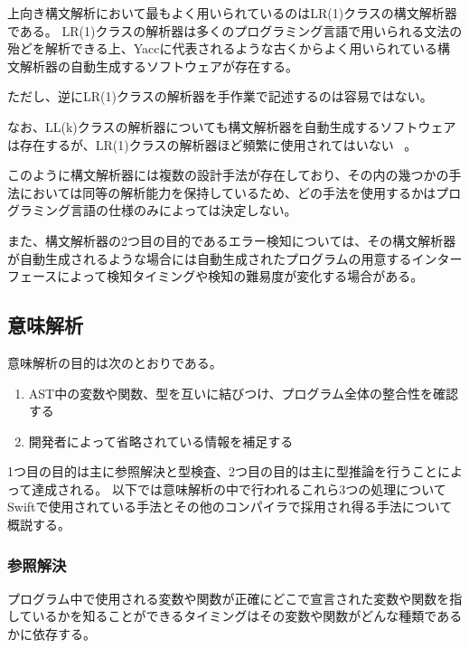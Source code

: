 
上向き構文解析において最もよく用いられているのはLR(1)クラスの構文解析器である。
LR(1)クラスの解析器は多くのプログラミング言語で用いられる文法の殆どを解析できる上、Yaccに代表されるような古くからよく用いられている構文解析器の自動生成するソフトウェアが存在する。

ただし、逆にLR(1)クラスの解析器を手作業で記述するのは容易ではない。

なお、LL(k)クラスの解析器についても構文解析器を自動生成するソフトウェアは存在するが、LR(1)クラスの解析器ほど頻繁に使用されてはいない ~\cite{antlr}。

\vspace{2em}

このように構文解析器には複数の設計手法が存在しており、その内の幾つかの手法においては同等の解析能力を保持しているため、どの手法を使用するかはプログラミング言語の仕様のみによっては決定しない。

また、構文解析器の2つ目の目的であるエラー検知については、その構文解析器が自動生成されるような場合には自動生成されたプログラムの用意するインターフェースによって検知タイミングや検知の難易度が変化する場合がある。

\subsection{意味解析}

意味解析の目的は次のとおりである。

\begin{enumerate}
    \item AST中の変数や関数、型を互いに結びつけ、プログラム全体の整合性を確認する
    \item 開発者によって省略されている情報を補足する
\end{enumerate}

1つ目の目的は主に参照解決と型検査、2つ目の目的は主に型推論を行うことによって達成される。
以下では意味解析の中で行われるこれら3つの処理についてSwiftで使用されている手法とその他のコンパイラで採用され得る手法について概説する。

\subsubsection{参照解決}

プログラム中で使用される変数や関数が正確にどこで宣言された変数や関数を指しているかを知ることができるタイミングはその変数や関数がどんな種類であるかに依存する。

